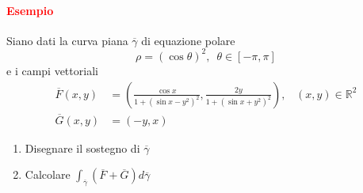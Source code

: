 \documentclass{article}
\newcommand{\R}{\mathbb{R}}
\begin{document}
\paragraph{\textcolor{red}{Esempio}}
Siano dati la curva piana $\overline{\gamma}$ di equazione polare
\begin{equation*}
    \rho = (\cos \theta)^2,\,\,\, \theta \in[-\pi,\pi] 
\end{equation*}
e i campi vettoriali
\begin{align*}
    \overline{F}(x,y)&=\left( \frac{\cos x}{1+(\sin x-y^2)^2},\frac{2y}{1+(\sin x + y^2)^2} \right),\,\,\,\,\,(x,y) \in \R^2 \\
    \overline{G}(x,y)&= (-y,x)
\end{align*}
\begin{enumerate}
    \item Disegnare il sostegno di $\overline{\gamma}$
    \item Calcolare $\int_{\overline{\gamma}}(\overline{F}+\overline{G})d\overline{\gamma}$
\end{enumerate}
\end{document}

